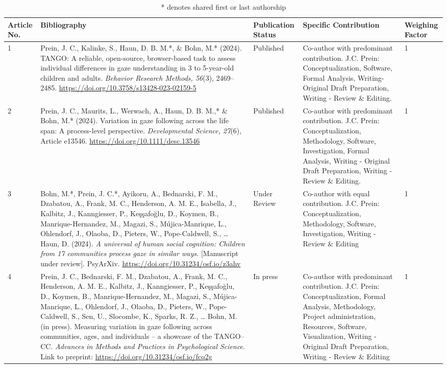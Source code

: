\documentclass[
]{scrbook}
\begin{document}
\begin{table}[H]
\centering
\footnotesize
\begin{tabular}{p{8mm}p{55mm}p{18mm}p{48mm}p{9mm}}\toprule
Article No. & Bibliography & Publication Status & Specific Contribution & Weighing Factor \\
\midrule
1 & Prein, J. C., Kalinke, S., Haun, D. B. M.*, \& Bohn, M.* (2024). TANGO: A reliable, open-source, browser-based task to assess individual differences in gaze understanding in 3 to 5-year-old children and adults. \textit{Behavior Research Methods, 56}(3), 2469–2485. \url{https://doi.org/10.3758/s13428-023-02159-5} & Published & Co-author with predominant contribution. J.C. Prein: Conceptualization, Software, Formal Analysis, Writing-Original Draft Preparation, Writing - Review \& Editing. & 1 \\
2 & Prein, J. C., Maurits, L., Werwach, A., Haun, D. B. M.,* \& Bohn, M.* (2024). Variation in gaze following across the life span: A process-level perspective. \textit{Developmental Science, 27}(6), Article e13546. \url{https://doi.org/10.1111/desc.13546} & Published & Co-author with predominant contribution. J.C. Prein: Conceptualization, Methodology, Software, Investigation, Formal Analysis, Writing - Original Draft Preparation, Writing - Review \& Editing.  & 1 \\
3 & Bohn, M.*, Prein, J. C.*, Ayikoru, A., Bednarski, F. M., Dzabatou, A., Frank, M. C., Henderson, A. M. E., Isabella, J., Kalbitz, J., Kanngiesser, P., Keşşafoğlu, D., Koymen, B., Manrique-Hernandez, M., Magazi, S., Mújica-Manrique, L., Ohlendorf, J., Olaoba, D., Pieters, W., Pope-Caldwell, S., … Haun, D. (2024). \textit{A universal of human social cognition: Children from 17 communities process gaze in similar ways.} [Manuscript under review]. PsyArXiv. \url{https://doi.org/10.31234/osf.io/z3ahv} & Under Review & Co-author with equal contribution. J.C. Prein: Conceptualization, Methodology, Software, Investigation, Writing - Review \& Editing & 1 \\
4 & Prein, J. C., Bednarski, F. M., Dzabatou, A., Frank, M. C., Henderson, A. M. E., Kalbitz, J., Kanngiesser, P., Keşşafoğlu, D., Koymen, B., Manrique-Hernandez, M., Magazi, S., Mújica-Manrique, L., Ohlendorf, J., Olaoba, D., Pieters, W., Pope-Caldwell, S., Sen, U., Slocombe, K., Sparks, R. Z., … Bohn, M. (in press). Measuring variation in gaze following across communities, ages, and individuals – a showcase of the TANGO–CC. \textit{Advances in Methods and Practices in Psychological Science}. Link to preprint: \url{https://doi.org/10.31234/osf.io/fcq2g} & In press & Co-author with predominant contribution. J.C. Prein: Conceptualization, Formal Analysis, Methodology, Project administration, Resources, Software, Visualization, Writing - Original Draft Preparation, Writing - Review \& Editing & 1 \\
\bottomrule
\end{tabular}
\caption{\scriptsize{* denotes shared first or last authorship}}
\end{table}
\end{document}
